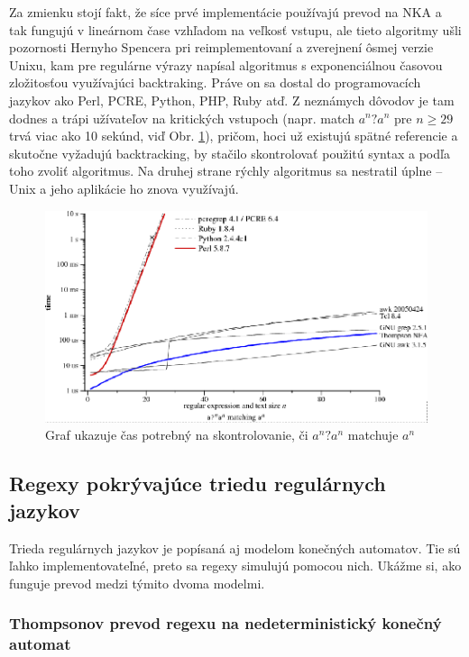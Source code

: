 Za zmienku stojí fakt, že síce prvé implementácie používajú prevod na NKA a tak fungujú v lineárnom čase vzhľadom na veľkosť vstupu, ale tieto algoritmy ušli pozornosti Hernyho Spencera pri reimplementovaní a zverejnení ôsmej verzie Unixu, kam pre regulárne výrazy napísal algoritmus s exponenciálnou časovou zložitosťou využívajúci backtraking. Práve on sa dostal do programovacích jazykov ako Perl, PCRE, Python, PHP, Ruby atď. Z neznámych dôvodov je tam dodnes a trápi užívateľov na kritických vstupoch (napr. match $a^n?a^n$ pre $n \geq 29$ trvá viac ako 10 sekúnd, viď Obr. \ref{fig:graf}), pričom, hoci už existujú spätné referencie a skutočne vyžadujú backtracking, by stačilo skontrolovať použitú syntax a podľa toho zvoliť algoritmus. Na druhej strane rýchly algoritmus sa nestratil úplne -- Unix a jeho aplikácie ho znova využívajú.
\begin{figure}[h]
  \centering
  \includegraphics[width=1\textwidth]{obrazky/graf}
  \caption{Graf ukazuje čas potrebný na skontrolovanie, či $a^n?a^n$ matchuje $a^n$}
  \label{fig:graf}
\end{figure}

\subsection*{Regexy pokrývajúce triedu regulárnych jazykov}
\label{praxregex}

Trieda regulárnych jazykov je popísaná aj modelom konečných automatov. Tie sú ľahko implementovateľné, preto sa regexy simulujú pomocou nich. Ukážme si, ako funguje prevod medzi týmito dvoma modelmi.

\subsubsection{Thompsonov prevod regexu na nedeterministický konečný automat \cite{Cox07SlowPython}}

